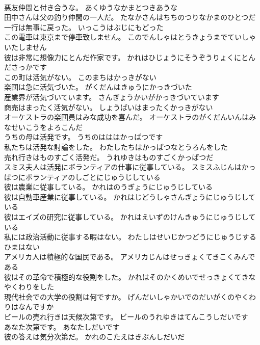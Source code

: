 \documentclass[8pt]{extreport}
\begin{document}
\begin{CJK}{UTF8}{min}
\\	悪友仲間と付き合うな。	あくゆうなかまとつきあうな 
\\	田中さんは父の釣り仲間の一人だ。	たなかさんはちちのつりなかまのひとつだ 
\\	一行は無事に戻った。	いっこうはぶじにもどった 
\\	この電車は東京まで停車致しません。	このでんしゃはとうきょうまでていしゃいたしません 
\\	彼は非常に想像力にとんだ作家です。	かれはひじょうにそうぞうりょくにとんださっかです 
\\	この町は活気がない。	このまちはかっきがない 
\\	楽団は急に活気づいた。	がくだんはきゅうにかっきづいた 
\\	産業界が活気づいています。	さんぎょうかいがかっきづいています 
\\	商売はまったく活気がない。	しょうばいはまったくかっきがない 
\\	オーケストラの楽団員はみな成功を喜んだ。	オーケストラのがくだんいんはみなせいこうをよろこんだ 
\\	うちの母は活発です。	うちのはははかっぱつです 
\\	私たちは活発な討論をした。	わたしたちはかっぱつなとうろんをした 
\\	売れ行きはものすごく活発だ。	うれゆきはものすごくかっぱつだ 
\\	スミス夫人は活発にボランティアの仕事に従事している。	スミスふじんはかっぱつにボランティアのしごとにじゅうじしている 
\\	彼は農業に従事している。	かれはのうぎょうにじゅうじしている 
\\	彼は自動車産業に従事している。	かれはじどうしゃさんぎょうにじゅうじしている 
\\	彼はエイズの研究に従事している。	かれはえいずのけんきゅうにじゅうじしている 
\\	私には政治活動に従事する暇はない。	わたしはせいじかつどうにじゅうじするひまはない 
\\	アメリカ人は積極的な国民である。	アメリカじんはせっきょくてきこくみんである 
\\	彼はその革命で積極的な役割をした。	かれはそのかくめいでせっきょくてきなやくわりをした 
\\	現代社会での大学の役割は何ですか。	げんだいしゃかいでのだいがくのやくわりはなんですか 
\\	ビールの売れ行きは天候次第です。	ビールのうれゆきはてんこうしだいです 
\\	あなた次第です。	あなたしだいです 
\\	彼の答えは気分次第だ。	かれのこたえはきぶんしだいだ 

\end{CJK}
\end{document}
